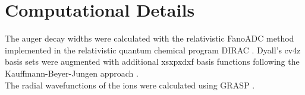 \section{Computational Details}
The auger decay widths were calculated with the relativistic FanoADC method
implemented in the relativistic quantum chemical program DIRAC \cite{DIRAC17}.
Dyall's cv4z basis sets \cite{} were augmented with additional xsxpxdxf
basis functions following the Kauffmann-Beyer-Jungen approach \cite{}.\\
The radial wavefunctions of the ions were calculated using GRASP \cite{}.
